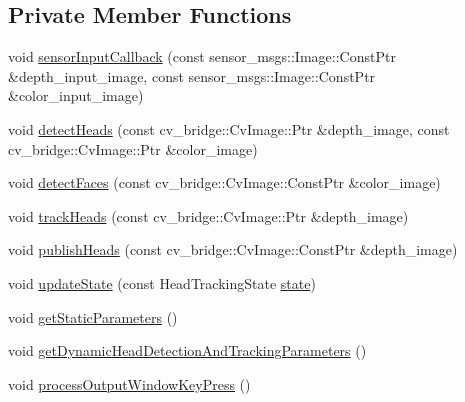 \subsection*{\-Private \-Member \-Functions}
\begin{DoxyCompactItemize}
\item 
void \hyperlink{class_r_p_head_tracking_node_a6c538471c6e3cee05aba40395da2cab1}{sensor\-Input\-Callback} (const sensor\-\_\-msgs\-::\-Image\-::\-Const\-Ptr \&depth\-\_\-input\-\_\-image, const sensor\-\_\-msgs\-::\-Image\-::\-Const\-Ptr \&color\-\_\-input\-\_\-image)
\item 
void \hyperlink{class_r_p_head_tracking_node_ac3df16b7bdb28ca965510d3d11a3296c}{detect\-Heads} (const cv\-\_\-bridge\-::\-Cv\-Image\-::\-Ptr \&depth\-\_\-image, const cv\-\_\-bridge\-::\-Cv\-Image\-::\-Ptr \&color\-\_\-image)
\item 
void \hyperlink{class_r_p_head_tracking_node_a96cb4451897d847dbb65da5d0c7ccac4}{detect\-Faces} (const cv\-\_\-bridge\-::\-Cv\-Image\-::\-Const\-Ptr \&color\-\_\-image)
\item 
void \hyperlink{class_r_p_head_tracking_node_a75bafea5dac2bb6e259e7e5dc4fe0c68}{track\-Heads} (const cv\-\_\-bridge\-::\-Cv\-Image\-::\-Ptr \&depth\-\_\-image)
\item 
void \hyperlink{class_r_p_head_tracking_node_a58746f98c78d01ff274c9bb355d4434a}{publish\-Heads} (const cv\-\_\-bridge\-::\-Cv\-Image\-::\-Const\-Ptr \&depth\-\_\-image)
\item 
void \hyperlink{class_r_p_head_tracking_node_ace266a6c4445813c0f005f3e0162a790}{update\-State} (const \-Head\-Tracking\-State \hyperlink{class_r_p_head_tracking_node_abb89a5e3747c9ce5c046381c2e02b226}{state})
\item 
void \hyperlink{class_r_p_head_tracking_node_a4c52f5c1276087c82d7aad6395b7cf39}{get\-Static\-Parameters} ()
\item 
void \hyperlink{class_r_p_head_tracking_node_ac95a0006516c380ec0a3771aa6fe96f7}{get\-Dynamic\-Head\-Detection\-And\-Tracking\-Parameters} ()
\item 
void \hyperlink{class_r_p_head_tracking_node_a8bf1d1dd8705693c57dc3f814114c4a5}{process\-Output\-Window\-Key\-Press} ()
\end{DoxyCompactItemize}
